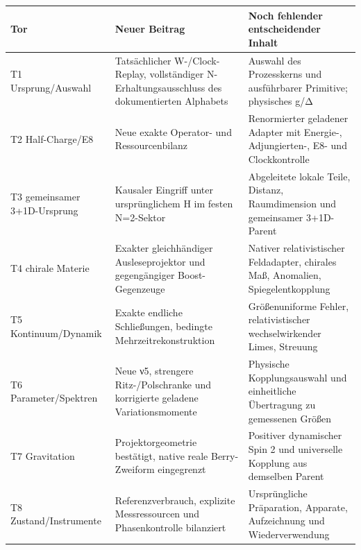 {\def\LTcaptype{none} %
\begin{longtable}[]{@{}
  >{\raggedright\arraybackslash}p{}
  >{\raggedright\arraybackslash}p{}
  >{\raggedright\arraybackslash}p{}@{}}
\toprule\noalign{}
\begin{minipage}[b]{\linewidth}\raggedright
Tor
\end{minipage} & \begin{minipage}[b]{\linewidth}\raggedright
Neuer Beitrag
\end{minipage} & \begin{minipage}[b]{\linewidth}\raggedright
Noch fehlender entscheidender Inhalt
\end{minipage} \\
\midrule\noalign{}
\endhead
\bottomrule\noalign{}
\endlastfoot
T1 Ursprung/Auswahl & Tatsächlicher W-/Clock-Replay, vollständiger
N-Erhaltungsausschluss des dokumentierten Alphabets & Auswahl des
Prozesskerns und ausführbarer Primitive; physisches g/Δ \\
T2 Half-Charge/E8 & Neue exakte Operator- und Ressourcenbilanz &
Renormierter geladener Adapter mit Energie-, Adjungierten-, E8- und
Clockkontrolle \\
T3 gemeinsamer 3+1D-Ursprung & Kausaler Eingriff unter ursprünglichem H
im festen N=2-Sektor & Abgeleitete lokale Teile, Distanz, Raumdimension
und gemeinsamer 3+1D-Parent \\
T4 chirale Materie & Exakter gleichhändiger Ausleseprojektor und
gegengängiger Boost-Gegenzeuge & Nativer relativistischer Feldadapter,
chirales Maß, Anomalien, Spiegelentkopplung \\
T5 Kontinuum/Dynamik & Exakte endliche Schließungen, bedingte
Mehrzeitrekonstruktion & Größenuniforme Fehler, relativistischer
wechselwirkender Limes, Streuung \\
T6 Parameter/Spektren & Neue ν5, strengere Ritz-/Polschranke und
korrigierte geladene Variationsmomente & Physische Kopplungsauswahl und
einheitliche Übertragung zu gemessenen Größen \\
T7 Gravitation & Projektorgeometrie bestätigt, native reale
Berry-Zweiform eingegrenzt & Positiver dynamischer Spin 2 und
universelle Kopplung aus demselben Parent \\
T8 Zustand/Instrumente & Referenzverbrauch, explizite Messressourcen und
Phasenkontrolle bilanziert & Ursprüngliche Präparation, Apparate,
Aufzeichnung und Wiederverwendung \\
\end{longtable}
}


